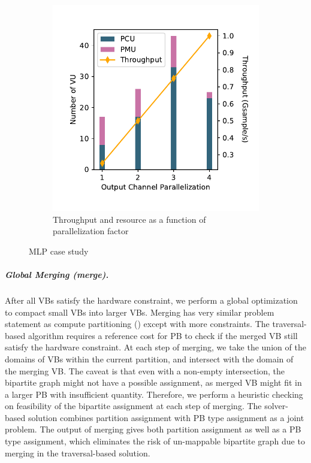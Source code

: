 \begin{figure}
\begin{subfigure}[b]{0.39\textwidth}
\includegraphics[width=1\textwidth]{figs/mlp.pdf}
\caption{Throughput and resource as a function of parallelization factor}
\end{subfigure}
\caption[MLP case study]{
  MLP case study
}
\label{fig:mlp}
\end{figure}

\subparagraph{Global Merging (merge).}
After all VBs satisfy the hardware constraint, we perform a global optimization to compact small VBs into  larger VBs. 
Merging has very similar problem statement as compute partitioning () except with more constraints.
The traversal-based algorithm requires a reference cost for PB to check if the merged VB still satisfy the hardware constraint.
At each step of merging, we take the union of the domains of VBs within the current partition, and intersect with the domain of the merging VB.
The caveat is that even with a non-empty intersection, the bipartite graph might not have a possible assignment, as merged VB might fit in a larger PB with insufficient quantity.
Therefore, we perform a heuristic checking on feasibility of the bipartite assignment at each step of merging.
The solver-based solution combines partition assignment with PB type assignment as a joint problem. 
The output of merging gives both partition assignment as well as a PB type assignment, which eliminates the risk of un-mappable bipartite graph due to merging in the traversal-based solution.


